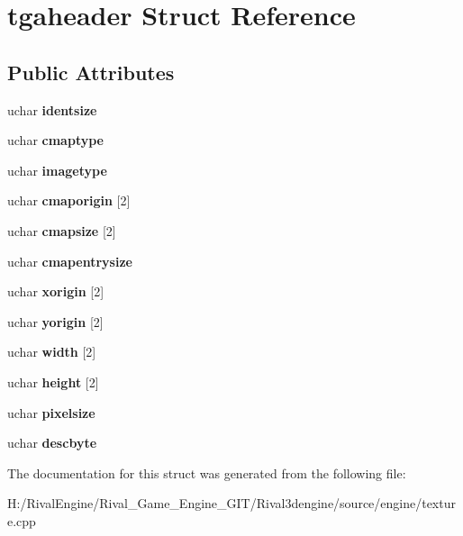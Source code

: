 \hypertarget{structtgaheader}{}\section{tgaheader Struct Reference}
\label{structtgaheader}
\subsection*{Public Attributes}
\begin{DoxyCompactItemize}
\item 
\mbox{\label{structtgaheader_a88939b077c4b5672713367ea13ec04f3}} 
uchar {\bfseries identsize}
\item 
\mbox{\label{structtgaheader_a3faaed264643a6f0f7bf57e31c6e3b4e}} 
uchar {\bfseries cmaptype}
\item 
\mbox{\label{structtgaheader_a3edfe91c9f14116d917999425376270c}} 
uchar {\bfseries imagetype}
\item 
\mbox{\label{structtgaheader_a7a2f7a906ff53a402c18671700611ec5}} 
uchar {\bfseries cmaporigin} \mbox{[}2\mbox{]}
\item 
\mbox{\label{structtgaheader_aa9fd93e1298af6f94532196632bab989}} 
uchar {\bfseries cmapsize} \mbox{[}2\mbox{]}
\item 
\mbox{\label{structtgaheader_a678b795dc1592cd8f4a8a7974f52bc65}} 
uchar {\bfseries cmapentrysize}
\item 
\mbox{\label{structtgaheader_aa3a13a3276d448285acb78103ae07f40}} 
uchar {\bfseries xorigin} \mbox{[}2\mbox{]}
\item 
\mbox{\label{structtgaheader_a87ebc79f884e558f6ccc127d5882b9e7}} 
uchar {\bfseries yorigin} \mbox{[}2\mbox{]}
\item 
\mbox{\label{structtgaheader_a4d0c510761057db5f3cd13709b814cdd}} 
uchar {\bfseries width} \mbox{[}2\mbox{]}
\item 
\mbox{\label{structtgaheader_a2d95267c78585029dcf4599808cc41aa}} 
uchar {\bfseries height} \mbox{[}2\mbox{]}
\item 
\mbox{\label{structtgaheader_a4d5b1df9d8dbb2d23b02a6d8908bb0d6}} 
uchar {\bfseries pixelsize}
\item 
\mbox{\label{structtgaheader_af87ff4b8bb916234ba4e9dd49910d1a7}} 
uchar {\bfseries descbyte}
\end{DoxyCompactItemize}


The documentation for this struct was generated from the following file\+:\begin{DoxyCompactItemize}
\item 
H\+:/\+Rival\+Engine/\+Rival\+\_\+\+Game\+\_\+\+Engine\+\_\+\+G\+I\+T/\+Rival3dengine/source/engine/texture.\+cpp\end{DoxyCompactItemize}
